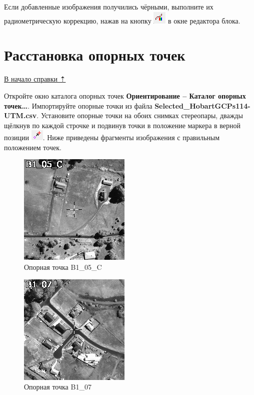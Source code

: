 \documentclass[
  12pt,
]{book}
\begin{document}
Если добавленные изображения получились чёрными, выполните их радиометрическую коррекцию, нажав на кнопку \includegraphics{images/Ref17/Radiometric_Correction.png} в окне редактора блока.

\hypertarget{rpc-gcp}{%
\section{Расстановка опорных точек}\label{rpc-gcp}}

\protect\hyperlink{rpc}{В начало справки ⇡}

Откройте окно каталога опорных точек \textbf{Ориентирование -- Каталог опорных точек\ldots{}}. Импортируйте опорные точки из файла \textbf{Selected\_HobartGCPs114-UTM.csv}. Установите опорные точки на обоих снимках стереопары, дважды щёлкнув по каждой строчке и подвинув точки в положение маркера в верной позиции \includegraphics{images/Ref17/Move_Point2Marker.png}. Ниже приведены фрагменты изображения с правильным положением точек.

\begin{figure}
\centering
\includegraphics{images/Ref17/B1_05_C.jpeg}
\caption{Опорная точка B1\_05\_C}
\end{figure}

\begin{figure}
\centering
\includegraphics{images/Ref17/B1_07.jpeg}
\caption{Опорная точка B1\_07}
\end{figure}
\end{document}
